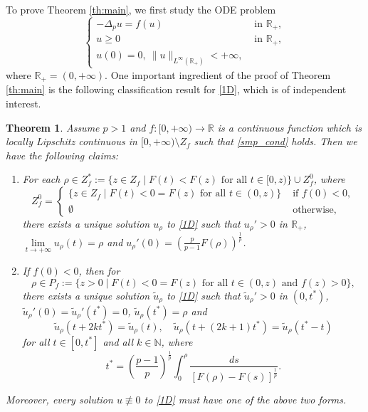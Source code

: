 \documentclass[reqno]{amsart}
\theoremstyle{plain}
\newtheorem{theorem}{Theorem}
\theoremstyle{definition}
\theoremstyle{remark}
\begin{document}
	To prove Theorem \ref{th:main}, we first study the ODE problem
	\begin{equation}\label{1D}
		\begin{cases}
			-\Delta_p u = f(u) & \text{ in } \mathbb{R}_+,\\
			u \ge 0 & \text{ in } \mathbb{R}_+,\\
			u(0)=0, ~ \|u\|_{L^\infty(\mathbb{R}_+)}<+\infty,
		\end{cases}
	\end{equation}
	where $\mathbb{R}_+=(0,+\infty)$.
	One important ingredient of the proof of Theorem \ref{th:main} is the following classification result for \eqref{1D}, which is of independent interest.
	\begin{theorem}\label{th:1D}
		Assume $p>1$ and $f:[0,+\infty)\to\mathbb{R}$ is a continuous function which is locally Lipschitz continuous in $[0,+\infty)\setminus Z_f$ such that \eqref{smp_cond} holds. Then we have the following claims:
		\begin{enumerate}
			\item[(i)] For each $\rho\in Z_f^*:=\{z\in Z_f \mid F(t) < F(z) \text{ for all } t\in [0,z)\} \cup Z_f^0$, where			
			\[
			Z_f^0=
			\begin{cases}
				\{z\in Z_f \mid F(t) < 0 = F(z) \text{ for all } t\in (0,z)\} &\text{ if } f(0) < 0,\\
				\emptyset &\text{ otherwise},
			\end{cases}
			\]		
			there exists a unique solution $u_\rho$ to \eqref{1D} such that $u_\rho'>0$ in $\mathbb{R}_+$, $\lim\limits_{t\to+\infty} u_\rho(t)=\rho$ and $u_\rho'(0)=\left(\frac{p}{p-1}F(\rho)\right)^\frac{1}{p}$.
			\item[(ii)] If $f(0)<0$, then for
			\[
			\rho\in P_f := \{z>0 \mid F(t) < 0 = F(z) \text{ for all } t\in (0,z) \text{ and } f(z)>0\},
			\]
			there exists a unique solution $\tilde u_\rho$ to \eqref{1D} such that $\tilde u_\rho'>0$ in $(0,t^*)$, $\tilde u_\rho'(0)=\tilde u_\rho'(t^*)=0$, $\tilde u_\rho(t^*)=\rho$ and
			\[
			\tilde u_\rho(t+2kt^*)=\tilde u_\rho(t), \quad \tilde u_\rho(t+(2k+1)t^*)=\tilde u_\rho(t^*-t)
			\]
			for all $t\in[0,t^*]$ and all $k\in\mathbb{N}$,
			where
			\[
			t^* = \left(\frac{p-1}{p}\right)^\frac{1}{p}\int_{0}^{\rho} \frac{ds}{\left[F(\rho)-F(s)\right]^\frac{1}{p}}.
			\]
		\end{enumerate}
		
		Moreover, every solution $u \not\equiv 0$ to \eqref{1D} must have one of the above two forms.
	\end{theorem}
	
\end{document}
